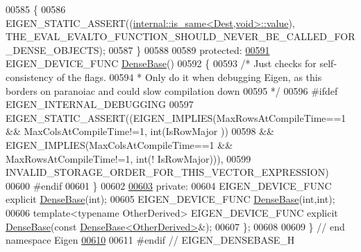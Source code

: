 \begin{DoxyCode}
00585 \textcolor{keyword}{    }\{
00586       EIGEN\_STATIC\_ASSERT((\hyperlink{struct_eigen_1_1internal_1_1is__same}{internal::is\_same<Dest,void>::value}),
      THE\_EVAL\_EVALTO\_FUNCTION\_SHOULD\_NEVER\_BE\_CALLED\_FOR\_DENSE\_OBJECTS);
00587     \}
00588 
00589   \textcolor{keyword}{protected}:
\hyperlink{group___core___module_ae966dfaa11cfd07e87da040b7a9d8216}{00591}     EIGEN\_DEVICE\_FUNC \hyperlink{group___core___module_ae966dfaa11cfd07e87da040b7a9d8216}{DenseBase}()
00592     \{
00593       \textcolor{comment}{/* Just checks for self-consistency of the flags.}
00594 \textcolor{comment}{       * Only do it when debugging Eigen, as this borders on paranoiac and could slow compilation down}
00595 \textcolor{comment}{       */}
00596 \textcolor{preprocessor}{#ifdef EIGEN\_INTERNAL\_DEBUGGING}
00597       EIGEN\_STATIC\_ASSERT((EIGEN\_IMPLIES(MaxRowsAtCompileTime==1 && MaxColsAtCompileTime!=1, \textcolor{keywordtype}{int}(IsRowMajor
      ))
00598                         && EIGEN\_IMPLIES(MaxColsAtCompileTime==1 && MaxRowsAtCompileTime!=1, \textcolor{keywordtype}{int}(!
      IsRowMajor))),
00599                           INVALID\_STORAGE\_ORDER\_FOR\_THIS\_VECTOR\_EXPRESSION)
00600 \textcolor{preprocessor}{#endif}
00601     \}
00602 
\hyperlink{group___core___module_a51dba0f45bdf7eef96043b318380054a}{00603}   \textcolor{keyword}{private}:
00604     EIGEN\_DEVICE\_FUNC \textcolor{keyword}{explicit} \hyperlink{group___core___module_class_eigen_1_1_dense_base}{DenseBase}(\textcolor{keywordtype}{int});
00605     EIGEN\_DEVICE\_FUNC \hyperlink{group___core___module_class_eigen_1_1_dense_base}{DenseBase}(\textcolor{keywordtype}{int},\textcolor{keywordtype}{int});
00606     \textcolor{keyword}{template}<\textcolor{keyword}{typename} OtherDerived> EIGEN\_DEVICE\_FUNC \textcolor{keyword}{explicit} \hyperlink{group___core___module_class_eigen_1_1_dense_base}{DenseBase}(\textcolor{keyword}{const} 
      \hyperlink{group___core___module_class_eigen_1_1_dense_base}{DenseBase<OtherDerived>}&);
00607 \};
00608 
00609 \} \textcolor{comment}{// end namespace Eigen}
\hyperlink{group___core___module_a06af178e6158c789e79987a60d4ae3b7}{00610} 
00611 \textcolor{preprocessor}{#endif // EIGEN\_DENSEBASE\_H}
\end{DoxyCode}
